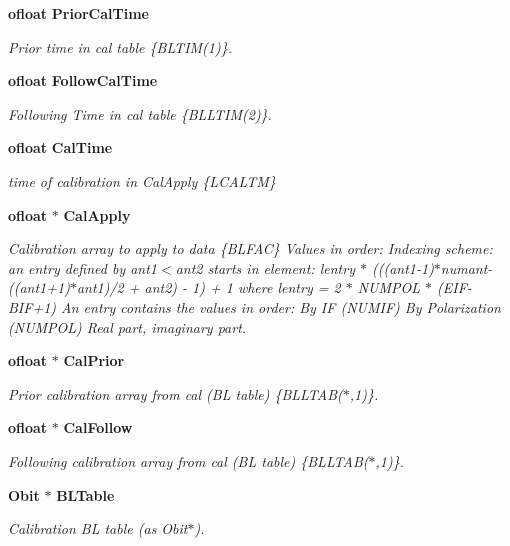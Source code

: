\begin{CompactItemize}
{\bf ofloat} {\bf Prior\-Cal\-Time}
\begin{CompactList}\small\item\em Prior time in cal table \{BLTIM(1)\}. \item\end{CompactList}\item 
{\bf ofloat} {\bf Follow\-Cal\-Time}
\begin{CompactList}\small\item\em Following Time in cal table \{BLLTIM(2)\}. \item\end{CompactList}\item 
{\bf ofloat} {\bf Cal\-Time}
\begin{CompactList}\small\item\em time of calibration in Cal\-Apply \{LCALTM\} \item\end{CompactList}\item 
{\bf ofloat} $\ast$ {\bf Cal\-Apply}
\begin{CompactList}\small\item\em Calibration array to apply to data \{BLFAC\} Values in order: Indexing scheme: an entry defined by ant1$<$ant2 starts in element: lentry $\ast$ (((ant1-1)$\ast$numant-((ant1+1)$\ast$ant1)/2 + ant2) - 1) + 1 where lentry = 2 $\ast$ NUMPOL $\ast$ (EIF-BIF+1) An entry contains the values in order: By IF (NUMIF) By Polarization (NUMPOL) Real part, imaginary part. \item\end{CompactList}\item 
{\bf ofloat} $\ast$ {\bf Cal\-Prior}
\begin{CompactList}\small\item\em Prior calibration array from cal (BL table) \{BLLTAB($\ast$,1)\}. \item\end{CompactList}\item 
{\bf ofloat} $\ast$ {\bf Cal\-Follow}
\begin{CompactList}\small\item\em Following calibration array from cal (BL table) \{BLLTAB($\ast$,1)\}. \item\end{CompactList}\item 
{\bf Obit} $\ast$ {\bf BLTable}
\begin{CompactList}\small\item\em Calibration BL table (as Obit$\ast$). \item\end{CompactList}\item 

\end{CompactItemize}
